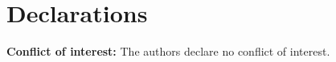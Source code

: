\documentclass[10pt,a4paper,twocolumn,twoside]{article}
\begin{document}
\section*{Declarations}

\noindent\textbf{Conflict of interest:} The authors declare no conflict of interest.





\end{document}
